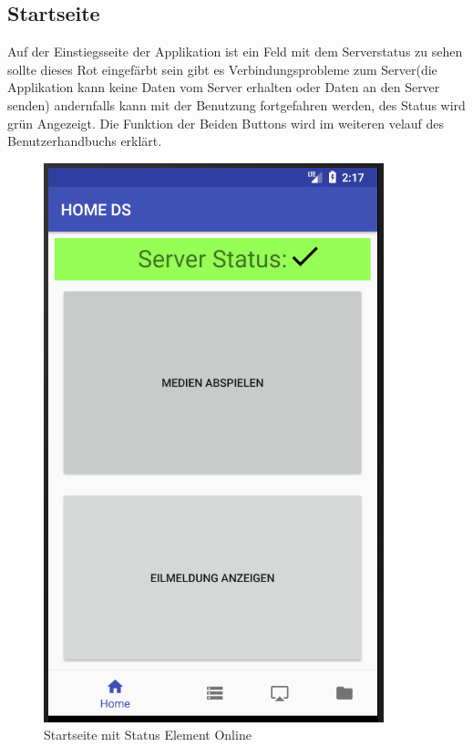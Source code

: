 \subsection{Startseite}
Auf der Einstiegsseite der Applikation ist ein Feld mit dem Serverstatus zu sehen sollte dieses Rot eingefärbt sein gibt es Verbindungsprobleme zum Server(die Applikation kann keine Daten vom Server erhalten oder Daten an den Server senden) andernfalls kann mit der Benutzung fortgefahren werden, des Status wird grün Angezeigt. Die Funktion der Beiden Buttons wird im weiteren velauf des Benutzerhandbuchs erklärt.
\\
\begin{figure}[H]
\centering
\includegraphics[scale=0.35]{images/06_AndroidApp/06_StatusOnline}
\caption{Startseite mit Status Element Online}
\label{fig:mediaNav}
\end{figure}
\\
\\
